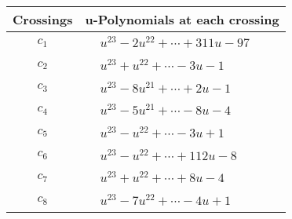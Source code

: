 \documentclass[1p]{elsarticle_modified}
\theoremstyle{definition}
\begin{document}
\begin{tabular}{m{50pt}|m{274pt}}
Crossings & \hspace{64pt}u-Polynomials at each crossing \\
\hline $$\begin{aligned}c_{1}\end{aligned}$$&$\begin{aligned}
&u^{23}-2 u^{22}+\cdots+311 u-97
\end{aligned}$\\
\hline $$\begin{aligned}c_{2}\end{aligned}$$&$\begin{aligned}
&u^{23}+u^{22}+\cdots-3 u-1
\end{aligned}$\\
\hline $$\begin{aligned}c_{3}\end{aligned}$$&$\begin{aligned}
&u^{23}-8 u^{21}+\cdots+2 u-1
\end{aligned}$\\
\hline $$\begin{aligned}c_{4}\end{aligned}$$&$\begin{aligned}
&u^{23}-5 u^{21}+\cdots-8 u-4
\end{aligned}$\\
\hline $$\begin{aligned}c_{5}\end{aligned}$$&$\begin{aligned}
&u^{23}- u^{22}+\cdots-3 u+1
\end{aligned}$\\
\hline $$\begin{aligned}c_{6}\end{aligned}$$&$\begin{aligned}
&u^{23}- u^{22}+\cdots+112 u-8
\end{aligned}$\\
\hline $$\begin{aligned}c_{7}\end{aligned}$$&$\begin{aligned}
&u^{23}+u^{22}+\cdots+8 u-4
\end{aligned}$\\
\hline $$\begin{aligned}c_{8}\end{aligned}$$&$\begin{aligned}
&u^{23}-7 u^{22}+\cdots-4 u+1
\end{aligned}$\\

\end{tabular}
\end{document}
